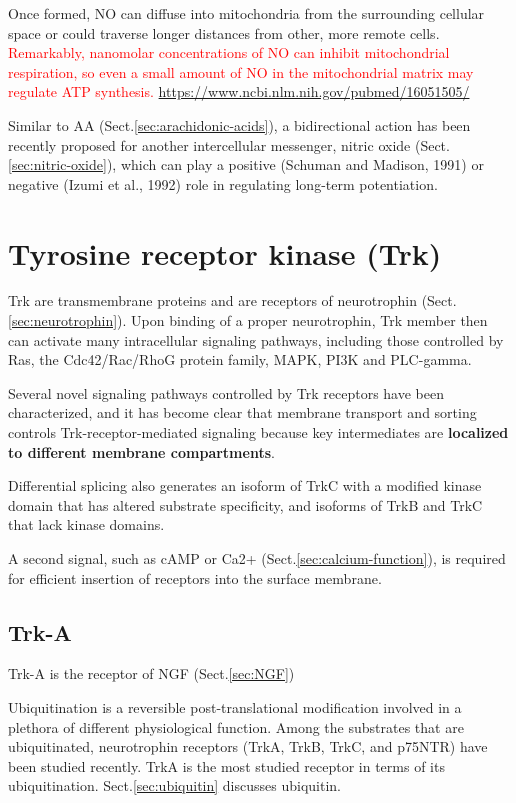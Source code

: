 Once formed, NO can diffuse into mitochondria from the surrounding cellular
space or could traverse longer distances from other, more remote cells.
\textcolor{red}{Remarkably, nanomolar concentrations of NO can inhibit
mitochondrial respiration, so even a small amount of NO in the mitochondrial
matrix may regulate ATP synthesis.}
\url{https://www.ncbi.nlm.nih.gov/pubmed/16051505/}


Similar to AA (Sect.\ref{sec:arachidonic-acids}), a bidirectional action has
been recently proposed for another intercellular messenger, nitric oxide
(Sect.\ref{sec:nitric-oxide}), which can play a positive (Schuman and Madison,
1991) or negative (Izumi et al., 1992) role in regulating long-term
potentiation.



\section{Tyrosine receptor kinase (Trk)}
\label{sec:Trk}

Trk are  transmembrane proteins and are receptors of neurotrophin
(Sect.\ref{sec:neurotrophin}).
Upon binding of a proper neurotrophin, Trk member then can activate many
intracellular signaling pathways, including those controlled by Ras, the
Cdc42/Rac/RhoG protein family, MAPK, PI3K and PLC-gamma.

Several novel signaling pathways controlled by Trk receptors have been
characterized, and it has become clear that membrane transport and sorting
controls Trk-receptor-mediated signaling because key intermediates are
{\bf localized to different membrane compartments}.

Differential splicing also generates an isoform of TrkC with a modified kinase
domain that has altered substrate specificity, and isoforms of TrkB and TrkC
that lack kinase domains.

A second signal, such as cAMP or Ca2+ (Sect.\ref{sec:calcium-function}), is
required for efficient insertion of receptors into the surface membrane.

\subsection{Trk-A}
\label{sec:Trk-A}

Trk-A is the receptor of NGF (Sect.\ref{sec:NGF})

Ubiquitination is a reversible post-translational modification involved in a
plethora of different physiological function. Among the substrates that are
ubiquitinated, neurotrophin receptors (TrkA, TrkB, TrkC, and p75NTR) have been
studied recently. TrkA is the most studied receptor in terms of its
ubiquitination. Sect.\ref{sec:ubiquitin} discusses ubiquitin.



